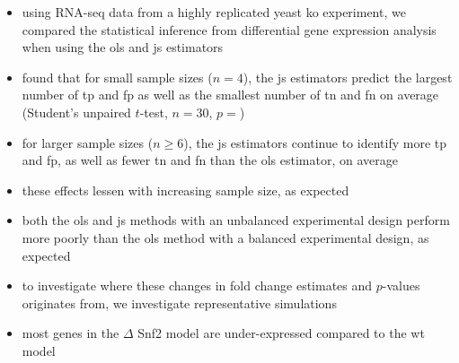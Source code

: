 \begin{itemize}
  \item using RNA-seq data from a highly replicated yeast \gls{ko} experiment, we compared the statistical inference from differential gene expression analysis when using the \gls{ols} and \gls{js} estimators
  \item found that for small sample sizes ($n = 4$), the \gls{js} estimators predict the largest number of \gls{tp} and \gls{fp} as well as the smallest number of \gls{tn} and \gls{fn} on average (Student's unpaired $t$-test, $n = 30$, $p = $)
  \item for larger sample sizes ($n \ge 6$), the \gls{js} estimators continue to identify more \gls{tp} and \gls{fp}, as well as fewer \gls{tn} and \gls{fn} than the \gls{ols} estimator, on average
  \item these effects lessen with increasing sample size, as expected
  \item both the \gls{ols} and \gls{js} methods with an unbalanced experimental design perform more poorly than the \gls{ols} method with a balanced experimental design, as expected
\end{itemize}


\begin{itemize}
  \item to investigate where these changes in fold change estimates and $p$-values originates from, we investigate representative simulations
  \item most genes in the $\Delta$ Snf2 model are under-expressed compared to the \gls{wt} model 
\end{itemize}


